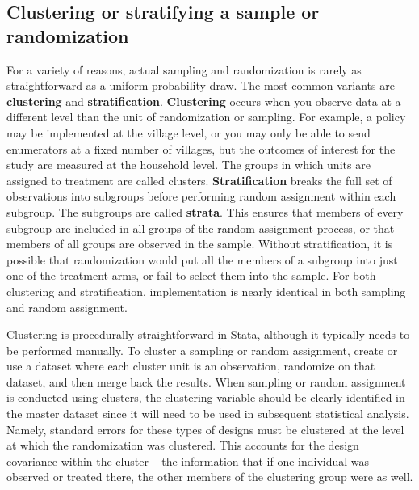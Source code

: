 

\subsection{Clustering or stratifying a sample or randomization}

For a variety of reasons, actual sampling and randomization
is rarely as straightforward as a uniform-probability draw.
The most common variants are \textbf{clustering} and \textbf{stratification}.\cite{athey2017econometrics}
\textbf{Clustering} occurs when you observe data at a different level
than the unit of randomization or sampling.
For example, a policy may be implemented at the village level,
or you may only be able to send enumerators at a fixed number of villages,
but the outcomes of interest for the study are measured at the household level.
The groups in which units are assigned to treatment are called clusters.
\textbf{Stratification} breaks the full set of observations into subgroups
before performing random assignment within each subgroup.
The subgroups are called \textbf{strata}.
This ensures that members of every subgroup
are included in all groups of the random assignment process,
or that members of all groups are observed in the sample.
Without stratification, it is possible that randomization
would put all the members of a subgroup into just one of the treatment arms,
or fail to select them into the sample.
For both clustering and stratification,
implementation is nearly identical in both sampling and random assignment.

Clustering is procedurally straightforward in Stata,
although it typically needs to be performed manually.
To cluster a sampling or random assignment,
create or use a dataset where each cluster unit is an observation,
randomize on that dataset, and then merge back the results.
When sampling or random assignment is conducted using clusters,
the clustering variable should be clearly identified in the master dataset
since it will need to be used in subsequent statistical analysis.
Namely, standard errors for these types of designs must be clustered
at the level at which the randomization was clustered.
This accounts for the design covariance within the cluster --
the information that if one individual was observed or treated there,
the other members of the clustering group were as well.

